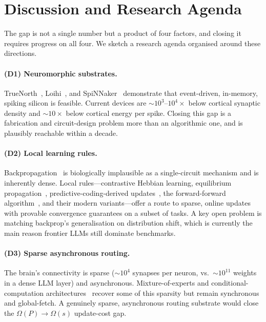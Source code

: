 \documentclass[11pt]{article}
\theoremstyle{definition}
\theoremstyle{remark}
\begin{document}
\section{Discussion and Research Agenda}
\label{sec:agenda}

The gap is not a single number but a product of four factors, and
closing it requires progress on all four.  We sketch a research
agenda organised around these directions.

\paragraph{(D1) Neuromorphic substrates.}
TrueNorth~\cite{merolla2014million}, Loihi~\cite{davies2018loihi},
and SpiNNaker~\cite{furber2014spinnaker} demonstrate that
event-driven, in-memory, spiking silicon is feasible.  Current
devices are $\sim 10^{3}$--$10^{4}\times$ below cortical synaptic
density and $\sim 10\times$ below cortical energy per spike.  Closing
this gap is a fabrication and circuit-design problem more than an
algorithmic one, and is plausibly reachable within a decade.

\paragraph{(D2) Local learning rules.}
Backpropagation~\cite{rumelhart1986learning} is biologically
implausible as a single-circuit mechanism and is inherently dense.
Local rules---contrastive Hebbian learning, equilibrium
propagation~\cite{scellier2017equilibrium},
predictive-coding-derived updates~\cite{whittington2017approx}, the
forward-forward algorithm~\cite{hinton2022forward}, and their modern
variants---offer a route to sparse, online updates with provable
convergence guarantees on a subset of tasks.  A key open problem is
matching backprop's generalisation on distribution shift, which is
currently the main reason frontier LLMs still dominate benchmarks.

\paragraph{(D3) Sparse asynchronous routing.}
The brain's connectivity is sparse ($\sim 10^{4}$ synapses per
neuron, vs.\ $\sim 10^{11}$ weights in a dense LLM layer) and
asynchronous.  Mixture-of-experts and conditional-computation
architectures~\cite{shazeer2017outrageously, fedus2022switch} recover
some of this sparsity but remain synchronous and global-fetch.
A genuinely sparse, asynchronous routing substrate would close the
$\Omega(P) \to \Omega(s)$ update-cost gap.
\end{document}
